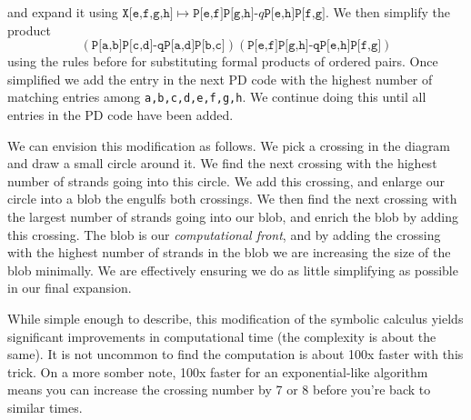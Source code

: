         and expand it using
        $\texttt{X[e,f,g,h]}\mapsto\texttt{P[e,f]P[g,h]-$q$P[e,h]P[f,g]}$. We
        then simplify the product
        \begin{equation}
            \nonumber
            (\texttt{P[a,b]P[c,d]-qP[a,d]P[b,c]})
            (\texttt{P[e,f]P[g,h]-qP[e,h]P[f,g]})
        \end{equation}
        using the rules before for substituting formal products of ordered
        pairs. Once simplified we add the entry in the next PD code with the
        highest number of matching entries among
        \texttt{a,b,c,d,e,f,g,h}. We continue doing this until all entries in
        the PD code have been added.
        \par\hfill\par
        We can envision this modification as follows. We pick a crossing in
        the diagram and draw a small circle around it. We find the next
        crossing with the highest number of strands going into this circle.
        We add this crossing, and enlarge our circle into a blob the engulfs
        both crossings. We then find the next crossing with the largest number
        of strands going into our blob, and enrich the blob by adding this
        crossing. The blob is our \textit{computational front}, and by
        adding the crossing with the highest number of strands in the blob we
        are increasing the size of the blob minimally. We are effectively
        ensuring we do as little simplifying as possible in our final
        expansion.
        \par\hfill\par
        While simple enough to describe, this modification of the symbolic
        calculus yields significant improvements in computational time (the
        complexity is about the same). It is not uncommon to find the
        computation is about 100x faster with this trick. On a more somber
        note, 100x faster for an exponential-like algorithm means you can
        increase the crossing number by 7 or 8 before you're back to similar
        times.
